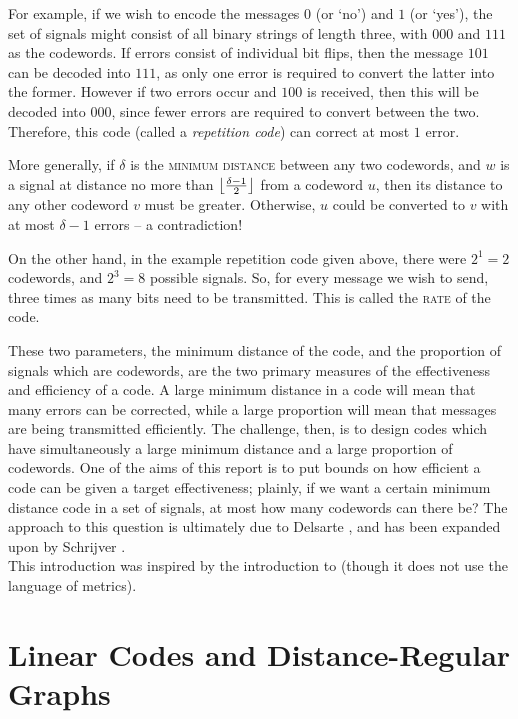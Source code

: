 \documentclass{report}
\begin{document}
    For example, if we wish to encode the messages $0$ (or `no') and $1$ (or
    `yes'), the set of signals might consist of all binary strings of length
    three, with $000$ and $111$ as the codewords.  If errors consist of
    individual bit flips, then the message $101$ can be decoded into $111$, as
    only one error is required to convert the latter into the former.  However
    if two errors occur and $100$ is received, then this will be decoded into
    $000$, since fewer errors are required to convert between the two.
    Therefore, this code (called a \textit{repetition code}) can correct at most
    $1$ error.

    More generally, if $\delta$ is the \textsc{minimum distance} between any two
    codewords, and $w$ is a signal at distance no more than $\left\lfloor \frac{\delta
    - 1}{2} \right\rfloor$ from a codeword $u$, then its distance to any other codeword $v$
    must be greater.  Otherwise, $u$ could be converted to $v$ with at most
    $\delta - 1$ errors -- a contradiction!

    On the other hand, in the example repetition code given above, there were
    $2^1 = 2$ codewords, and $2^3 = 8$ possible signals.  So, for every message
    we wish to send, three times as many bits need to be transmitted.  This is
    called the \textsc{rate} of the code.

    These two parameters, the minimum distance of the code, and the proportion
    of signals which are codewords, are the two primary measures of the
    effectiveness and efficiency of a code.  A large minimum distance in a code
    will mean that many errors can be corrected, while a large proportion will
    mean that messages are being transmitted efficiently.  The challenge, then,
    is to design codes which have simultaneously a large minimum distance and a
    large proportion of codewords.  One of the aims of this report is to put
    bounds on how efficient a code can be given a target effectiveness; plainly,
    if we want a certain minimum distance code in a set of signals, at most how
    many codewords can there be?  The approach to this question is ultimately
    due to Delsarte \cite{delsarte}, and has been expanded upon by Schrijver
    \cite{schrijver}.
    \\

    This introduction was inspired by the introduction to \cite{pless} (though
    it does not use the language of metrics).

    \FloatBarrier
  \section{Linear Codes and Distance-Regular
    Graphs}\label{sec:intro:linear->drg}
\end{document}
